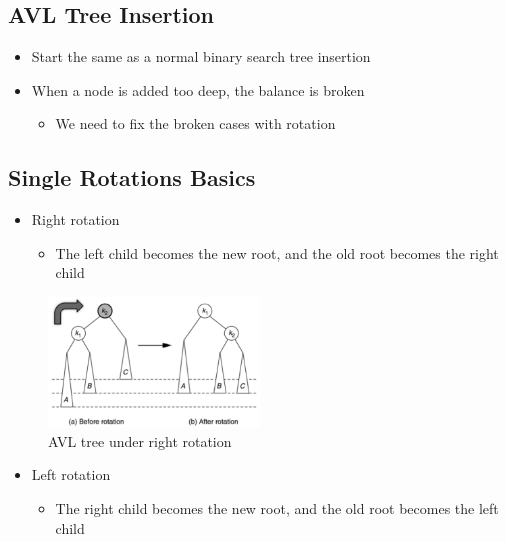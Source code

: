 \documentclass[
  10pt,
  english,
  letterpaper,
,tablecaptionabove
]{scrartcl}
\providecommand{\tightlist}{%
  \setlength{\itemsep}{0pt}\setlength{\parskip}{0pt}}
\begin{document}
\hypertarget{avl-tree-insertion}{%
\subsection{AVL Tree Insertion}\label{avl-tree-insertion}}

\begin{itemize}
\tightlist
\item
  Start the same as a normal binary search tree insertion
\item
  When a node is added too deep, the balance is broken

  \begin{itemize}
  \tightlist
  \item
    We need to fix the broken cases with rotation
  \end{itemize}
\end{itemize}

\hypertarget{single-rotations-basics}{%
\subsection{Single Rotations Basics}\label{single-rotations-basics}}

\begin{itemize}
\tightlist
\item
  Right rotation

  \begin{itemize}
  \tightlist
  \item
    The left child becomes the new root, and the old root becomes the
    right child
  \end{itemize}
\end{itemize}

\begin{figure}
\centering
\includegraphics[width=0.5\textwidth,height=\textheight]{images/3.png}
\caption{AVL tree under right rotation}
\end{figure}

\begin{itemize}
\tightlist
\item
  Left rotation

  \begin{itemize}
  \tightlist
  \item
    The right child becomes the new root, and the old root becomes the
    left child
  \end{itemize}
\end{itemize}
\end{document}
